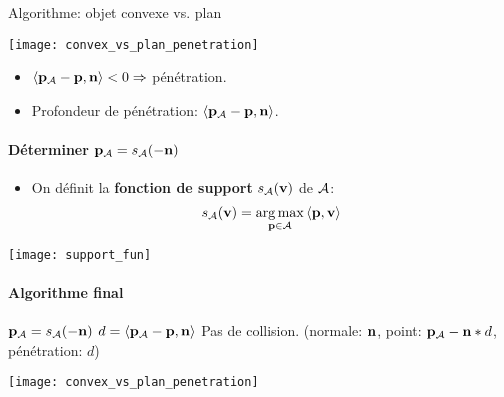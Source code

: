 \begin{frame}[fragile]{Algorithme: objet convexe vs. plan}
{{\begin{center}
               \texttt{[image: convex\_vs\_plan\_penetration]}
           \end{center}
           \begin{itemize}
               \item $\left< {\bf p_\mathcal{A}} - \textbf{p}, {\bf n} \right> < 0 \Rightarrow$ pénétration.
               \item Profondeur de pénétration: $\left< {\bf p_\mathcal{A}} - \textbf{p}, {\bf n}\right>$.
           \end{itemize}
       }
         {
            \framesubtitle{Déterminer ${\bf p_\mathcal{A}} = s_{\mathcal{A}}(-{\bf n})$}
                \begin{itemize}
                    \item On définit la \textbf{fonction de support} $s_{\mathcal{A}}(\textbf{v})$
                        de $\mathcal{A}$:
                        \[
                            s_{\mathcal{A}}(\textbf{v}) = \operatorname*{arg\,max}\limits_{\textbf{p} \in \mathcal{A}} \left< \textbf{p}, \textbf{v} \right>
                        \]
                \end{itemize}
                 {
                    \begin{center}
                        \texttt{[image: support\_fun]}
                    \end{center}
                }
        }
         {
            \framesubtitle{Algorithme final}
            \begin{algorithm}[H]
            \begin{algorithmic}[1]
                \STATE ${\bf p_\mathcal{A}}  = s_{\mathcal{A}}(-{\bf n})$
                \STATE $d = \left< {\bf p_\mathcal{A}} - \textbf{p}, {\bf n} \right>$
                    \RETURN Pas de collision.
                \ENDIF
                \RETURN (normale: ${\bf n}$, point: ${\bf p_\mathcal{A}} - {\bf n} * d$, pénétration: $d$)
            \end{algorithmic}
            \end{algorithm}
                \begin{center}
                    \texttt{[image: convex\_vs\_plan\_penetration]}
                \end{center}
        }
    }
\end{frame}

